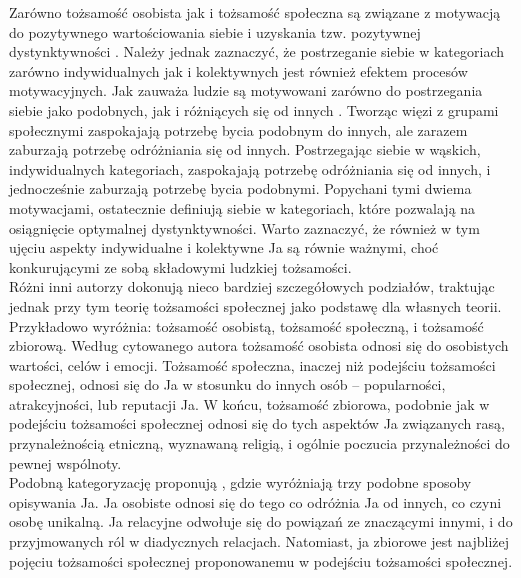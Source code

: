 \documentclass[man]{apa6}
\begin{document}
Zarówno tożsamość osobista jak i tożsamość społeczna są związane z motywacją do pozytywnego wartościowania siebie i uzyskania tzw. pozytywnej dystynktywności \parencite{tajfel1986social}. Należy jednak zaznaczyć, że postrzeganie siebie w kategoriach zarówno indywidualnych jak i kolektywnych jest również efektem procesów motywacyjnych. Jak zauważa \textcite{brewer1991social} ludzie są motywowani zarówno do postrzegania siebie jako podobnych, jak i różniących się od innych \parencite[patrz również,][]{brewer2007importance}. Tworząc więzi z grupami społecznymi zaspokajają potrzebę bycia podobnym do innych, ale zarazem zaburzają potrzebę odróżniania się od innych. Postrzegając siebie w wąskich, indywidualnych kategoriach, zaspokajają potrzebę odróżniania się od innych, i jednocześnie zaburzają potrzebę bycia podobnymi. Popychani tymi dwiema motywacjami, ostatecznie definiują siebie w kategoriach, które pozwalają na osiągnięcie optymalnej dystynktywności. Warto zaznaczyć, że również w tym ujęciu aspekty indywidualne i kolektywne Ja są równie ważnymi, choć konkurującymi ze sobą składowymi ludzkiej tożsamości.\\

Różni inni autorzy dokonują nieco bardziej szczegółowych podziałów, traktując jednak przy tym teorię tożsamości społecznej jako podstawę dla własnych teorii. Przykładowo \textcite{cheek1989identity} wyróżnia: tożsamość osobistą, tożsamość społeczną, i tożsamość zbiorową. Według cytowanego autora tożsamość osobista odnosi się do osobistych wartości, celów i emocji. Tożsamość społeczna, inaczej niż podejściu tożsamości społecznej, odnosi się do Ja w stosunku do innych osób -- popularności, atrakcyjności, lub reputacji Ja. W końcu, tożsamość zbiorowa, podobnie jak w podejściu tożsamości społecznej odnosi się do tych aspektów Ja związanych rasą, przynależnością etniczną, wyznawaną religią, i ogólnie poczucia przynależności do pewnej wspólnoty.\\

Podobną kategoryzację proponują \textcite{brewer1996we}, gdzie wyróżniają trzy podobne sposoby opisywania Ja. Ja osobiste odnosi się do tego co odróżnia Ja od innych, co czyni osobę unikalną. Ja relacyjne odwołuje się do powiązań ze znaczącymi innymi, i do przyjmowanych ról w diadycznych relacjach. Natomiast, ja zbiorowe jest najbliżej pojęciu tożsamości społecznej proponowanemu w podejściu tożsamości społecznej.\\
\end{document}
